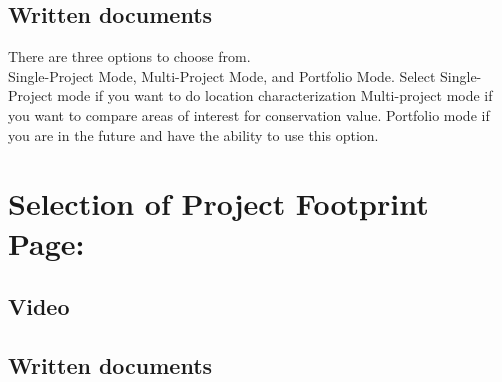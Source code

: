 \documentclass[
]{book}
\begin{document}
\hypertarget{written-documents}{%
\section{Written documents}\label{written-documents}}

There are three options to choose from.\\
Single-Project Mode, Multi-Project Mode, and Portfolio Mode.
Select Single-Project mode if you want to do location characterization
Multi-project mode if you want to compare areas of interest for conservation value.
Portfolio mode if you are in the future and have the ability to use this option.

\hypertarget{selection-of-project-footprint-page}{%
\chapter{Selection of Project Footprint Page:}\label{selection-of-project-footprint-page}}

\hypertarget{video-1}{%
\section{Video}\label{video-1}}

\hypertarget{written-documents-1}{%
\section{Written documents}\label{written-documents-1}}
\end{document}
